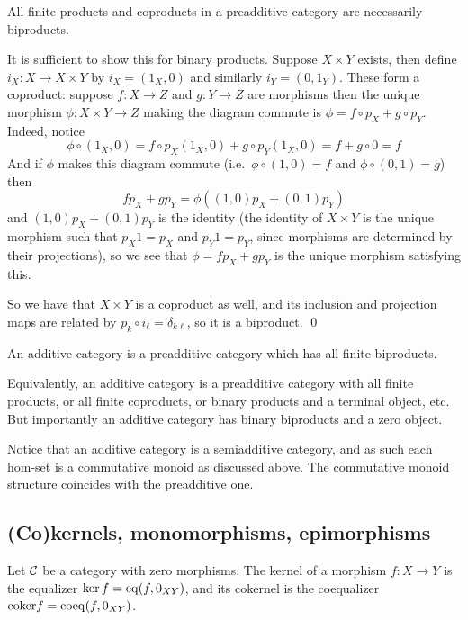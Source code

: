 \bprop

    All finite products and coproducts in a preadditive category are necessarily biproducts.

\eprop

\bproof

    It is sufficient to show this for binary products.
    Suppose $X\times Y$ exists, then define $i_X\colon X\to X\times Y$ by $i_X=(1_X,0)$ and similarly $i_Y=(0,1_Y)$.
    These form a coproduct: suppose $f\colon X\to Z$ and $g\colon Y\to Z$ are morphisms then the unique morphism $\phi\colon X\times Y\to Z$
    making the diagram commute is $\phi=f\circ p_X+g\circ p_Y$.
    Indeed, notice
    $$ \phi\circ(1_X,0) = f\circ p_X(1_X,0) + g\circ p_Y(1_X,0) = f + g\circ0 = f $$
    And if $\phi$ makes this diagram commute (i.e.\ $\phi\circ(1,0)=f$ and $\phi\circ(0,1)=g$) then
    $$ fp_X + gp_Y = \phi((1,0)p_X + (0,1)p_Y) $$
    and $(1,0)p_X+(0,1)p_Y$ is the identity (the identity of $X\times Y$ is the unique morphism such that $p_X1=p_X$ and $p_Y1=p_Y$, since morphisms are determined by
    their projections), so we see that $\phi=fp_X+gp_Y$ is the unique morphism satisfying this.

    So we have that $X\times Y$ is a coproduct as well, and its inclusion and projection maps are related by $p_k\circ i_\ell=\delta_{k\ell}$, so it is a biproduct.
    \qed

\eproof

\bdefn

    An {\emphcolor additive category} is a preadditive category which has all finite biproducts.

\edefn

Equivalently, an additive category is a preadditive category with all finite products, or all finite coproducts, or binary products and a terminal object, etc.
But importantly an additive category has binary biproducts and a zero object.

Notice that an additive category is a semiadditive category, and as such each hom-set is a commutative monoid as discussed above.
The commutative monoid structure coincides with the preadditive one.

\subsection{(Co)kernels, monomorphisms, epimorphisms}

\bdefn

    Let ${{\cal C}}$ be a category with zero morphisms.
    The {\emphcolor kernel} of a morphism $f\colon X\to Y$ is the equalizer $\ker f={\rm eq}(f,0_{XY})$, and its {\emphcolor cokernel} is the coequalizer ${\rm coker} f={\rm coeq}(f,0_{XY})$.

